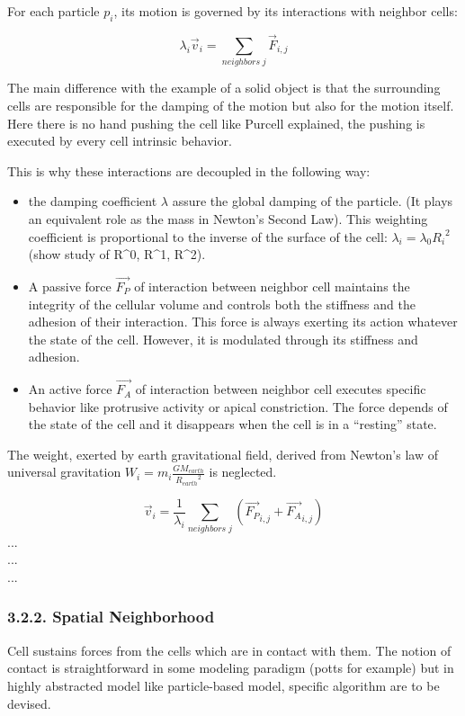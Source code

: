 For each particle $p_i$, its motion is governed by its interactions with neighbor cells:

$$\lambda_i \vec{v}_{i} = \sum_{neighbors\;j} \vec{F}_{i,j}$$

The main difference with the example of a solid object is that the surrounding cells are responsible for the damping of the motion but also for the motion itself. Here there is no hand pushing the cell like Purcell explained, the pushing is executed by every cell intrinsic behavior. 

This is why these interactions are decoupled in the following way:
\begin{itemize}
	\item the damping coefficient $\lambda$ assure the global damping of the particle. (It plays an equivalent role as the mass in Newton's Second Law). This weighting coefficient is proportional to the inverse of the surface of the cell: $ \lambda_i = \lambda_0 {R_i}^2$ (show study of R^0, R^1, R^2). 
	\item A passive force $\vec{F_P}$ of interaction between neighbor cell maintains the integrity of the cellular volume and controls both the stiffness and the adhesion of their interaction. This force is always exerting its action whatever the state of the cell. However, it is modulated through its stiffness and adhesion. 
	\item An active force $\vec{F_A}$ of interaction between neighbor cell executes specific behavior like protrusive activity or apical constriction. The force depends of the state of the cell and it disappears when the cell is in a “resting” state.
\end{itemize}

The weight, exerted by earth gravitational field, derived from Newton's law of universal gravitation $W_i = m_i \frac{G  M_{earth}}  {{R_{earth}}^2} $ is neglected. 

$$\vec{v}_{i} =  \frac{1}{\lambda_i} \sum_{neighbors\;j} \left ( \vec{F_P}_{i,j} + \vec{F_A}_{i,j} \right )$$    ...
\\ ...
\\ ...
\\

\subsubsection{3.2.2. Spatial Neighborhood  }

Cell sustains forces from the cells which are in contact with them. The notion of contact is straightforward in some modeling paradigm (potts for example) but in highly abstracted model like particle-based model, specific algorithm are to be devised. 

